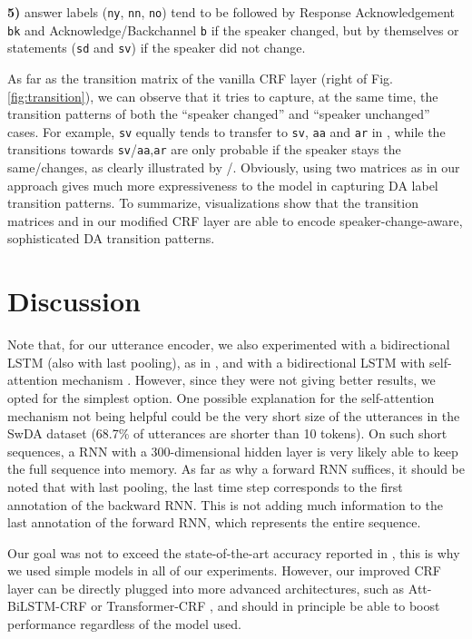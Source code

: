 \documentclass[11pt,a4paper]{article}
\begin{document}
\noindent \textbf{5)} answer labels (\texttt{ny}, \texttt{nn}, \texttt{no}) tend to be followed by Response Acknowledgement \texttt{bk} and Acknowledge/Backchannel \texttt{b} if the speaker changed, but by themselves or statements (\texttt{sd} and \texttt{sv}) if the speaker did not change.

As far as the transition matrix  of the vanilla CRF layer (right of Fig. \ref{fig:transition}), we can observe that it tries to capture, at the same time, the transition patterns of both the ``speaker changed'' and ``speaker unchanged'' cases.
For example, \texttt{sv} equally tends to transfer to \texttt{sv}, \texttt{aa} and \texttt{ar} in , while the transitions towards \texttt{sv}/\texttt{aa},\texttt{ar} are only probable if the speaker stays the same/changes, as clearly illustrated by /.
Obviously, using two matrices as in our approach gives much more expressiveness to the model in capturing DA label transition patterns.
To summarize, visualizations show that the transition matrices  and  in our modified CRF layer are able to encode speaker-change-aware, sophisticated DA transition patterns.

\section{Discussion}

Note that, for our utterance encoder, we also experimented with a bidirectional LSTM (also with last pooling), as in \citep{kumar2018dialogue}, and with a bidirectional LSTM with self-attention mechanism \citep{yang-etal-2016-hierarchical}.
However, since they were not giving better results, we opted for the simplest option.
One possible explanation for the self-attention mechanism not being helpful could be the very short size of the utterances in the SwDA dataset (68.7\% of utterances are shorter than 10 tokens).
On such short sequences, a RNN with a 300-dimensional hidden layer is very likely able to keep the full sequence into memory.
As far as why a forward RNN suffices, it should be noted that with last pooling, the last time step corresponds to the first annotation of the backward RNN.
This is not adding much information to the last annotation of the forward RNN, which represents the entire sequence.

Our goal was not to exceed the state-of-the-art accuracy reported in \cite{li-etal-2019-dual,raheja-tetreault-2019-dialogue}, this is why we used simple models in all of our experiments.
However, our improved CRF layer can be directly plugged into more advanced architectures, such as Att-BiLSTM-CRF \citep{luo2018attention} or Transformer-CRF \citep{chen2019bert,zhang2019using,yan2019tener,winata2019hierarchical}, and should in principle be able to boost performance regardless of the model used.
\end{document}

